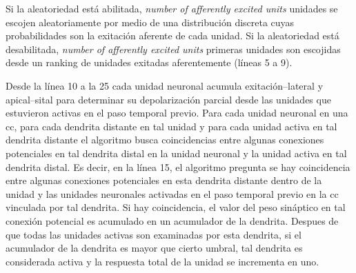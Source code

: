 {\begin{algorithm}
\begin{algorithmic}[1]
				\ENDIF
			\ENDFOR
			\ENDIF
		\ENDFOR
	\ENDFOR

\end{algorithmic}
\end{algorithm}

Si la aleatoriedad está abilitada, \emph{number of afferently excited units} unidades se escojen aleatoriamente por medio de una distribución discreta cuyas probabilidades son la exitación aferente de cada unidad. Si la aleatoriedad está desabilitada, \emph{number of afferently excited units} primeras unidades son escojidas desde un ranking de unidades exitadas aferentemente (líneas 5 a 9).

Desde la línea 10 a la 25 cada unidad neuronal acumula exitación--lateral y apical--sital para determinar su depolarización parcial desde las unidades que estuvieron activas en el paso temporal previo. Para cada unidad neuronal en una \gls{cc}, para cada dendrita distante en tal unidad y para cada unidad activa en tal dendrita distante el algoritmo busca coincidencias entre algunas conexiones potenciales en tal dendrita distal en la unidad neuronal y la unidad activa en tal dendrita distal.
Es decir, en la línea 15, el algoritmo pregunta se hay coincidencia entre algunas conexiones potenciales en esta dendrita distante dentro de la unidad y las unidades neuronales activadas en el paso temporal previo en la \gls{cc} vinculada por tal dendrita.
Si hay coincidencia, el valor del peso sináptico en tal conexión potencial es acumulado en un acumulador de la dendrita.
Despues de que todas las unidades activas son examinadas por esta dendrita, si el acumulador de la dendrita es mayor que cierto umbral, tal dendrita es considerada activa y la respuesta total de la unidad se incrementa en uno.

}
